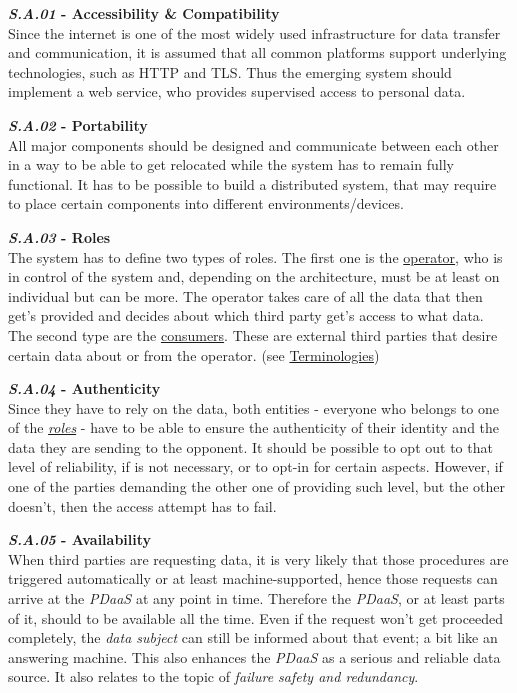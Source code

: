 \documentclass[12pt,english,a4paper,titlepage,cleardoublepage=empty,dottedtoc]{report}
\begin{document}
\textbf{\emph{\protect\hypertarget{sa01}{}{S.A.01}} - Accessibility \&
Compatibility}\\
Since the internet is one of the most widely used infrastructure for
data transfer and communication, it is assumed that all common platforms
support underlying technologies, such as HTTP and TLS. Thus the emerging
system should implement a web service, who provides supervised access to
personal data.

\textbf{\emph{\protect\hypertarget{sa02}{}{S.A.02}} - Portability}\\
All major components should be designed and communicate between each
other in a way to be able to get relocated while the system has to
remain fully functional. It has to be possible to build a distributed
system, that may require to place certain components into different
environments/devices.

\textbf{\emph{\protect\hypertarget{sa03}{}{S.A.03}} - Roles}\\
The system has to define two types of roles. The first one is the
\protect\hyperlink{terminologies--operator}{operator}, who is in control
of the system and, depending on the architecture, must be at least on
individual but can be more. The operator takes care of all the data that
then get's provided and decides about which third party get's access to
what data. The second type are the
\protect\hyperlink{terminologies--consumer}{consumers}. These are
external third parties that desire certain data about or from the
operator. (see \protect\hyperlink{terminologies}{Terminologies})

\textbf{\emph{\protect\hypertarget{sa04}{}{S.A.04}} - Authenticity}\\
Since they have to rely on the data, both entities - everyone who
belongs to one of the \emph{\protect\hyperlink{sa03}{roles}} - have to
be able to ensure the authenticity of their identity and the data they
are sending to the opponent. It should be possible to opt out to that
level of reliability, if is not necessary, or to opt-in for certain
aspects. However, if one of the parties demanding the other one of
providing such level, but the other doesn't, then the access attempt has
to fail.

\textbf{\emph{\protect\hypertarget{sa05}{}{S.A.05}} - Availability}\\
When third parties are requesting data, it is very likely that those
procedures are triggered automatically or at least machine-supported,
hence those requests can arrive at the \emph{PDaaS} at any point in
time. Therefore the \emph{PDaaS}, or at least parts of it, should to be
available all the time. Even if the request won't get proceeded
completely, the \emph{data subject} can still be informed about that
event; a bit like an answering machine. This also enhances the
\emph{PDaaS} as a serious and reliable data source. It also relates to
the topic of \emph{failure safety and redundancy}.
\end{document}
